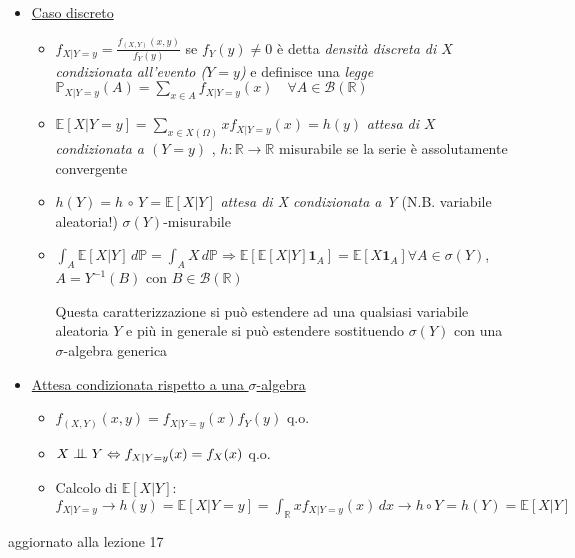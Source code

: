 \documentclass[openany]{book} %
\newcommand{\ind}{\mathrel{\text{\scalebox{1.07}{$\perp\mkern-10mu\perp$}}}}
\begin{document}
\begin{itemize}

\item \underline{Caso discreto}

\begin{itemize}

\item $f_{X|Y=y} = \frac{f_(X,Y)(x,y)}{f_Y(y)}$ se $f_Y(y)\neq 0$ è detta \textit{densità discreta di $X$ condizionata all'evento ($Y=y$)} e definisce una \textit{legge} $\mathbb{P}_{X|Y=y}(A) = \displaystyle\sum_{x\in A}f_{X|Y=y}(x) \quad \forall A\in \mathcal{B}(\mathbb{R})$

\item $\mathbb{E}[X|Y=y] = \displaystyle\sum_{x\in X(\Omega)}xf_{X|Y=y}(x) = h(y)$ \textit{attesa di $X$ condizionata a $(Y=y)$} , $h: \mathbb{R}\rightarrow \mathbb{R}$ misurabile se la serie è assolutamente convergente

\item $h(Y)=h\,\circ\,Y = \mathbb{E}[X|Y]$ \textit{attesa di X condizionata a Y} (N.B. variabile aleatoria!) $\sigma(Y)$-misurabile

\item $\int_A \mathbb{E}[X|Y]\,d \mathbb{P} = \int_AX\,d \mathbb{P}\Rightarrow \mathbb{E}[\mathbb{E}[X|Y]\boldsymbol{1}_A] = \mathbb{E}[X \boldsymbol{1}_A]$\quad$\forall A \in \sigma(Y)$, $A=Y^{-1}(B)$ con $B\in \mathcal{B}(\mathbb{R})$

Questa caratterizzazione si può estendere ad una qualsiasi variabile aleatoria $Y$ e più in generale si può estendere sostituendo $\sigma(Y)$ con una $\sigma$-algebra generica

\end{itemize}

\item \underline{Attesa condizionata rispetto a una $\sigma$-algebra} 

\begin{itemize}

\item $f_{(X,Y)}(x,y) = f_{X|Y=y}(x)f_Y(y)$ q.o.
	
\item $X\ind Y \Leftrightarrow f_{X|Y=y}(x)=f_X(x)$ q.o.

\item Calcolo di $\mathbb{E}[X|Y]$: $f_{X|Y=y}\rightarrow h(y)=\mathbb{E}[X|Y=y] = \int_\mathbb{R}xf_{X|Y=y}(x)\,dx \rightarrow h\circ Y = h(Y)=\mathbb{E}[X|Y]$

\end{itemize}

\end{itemize}



\huge aggiornato alla lezione 17
\end{document}

